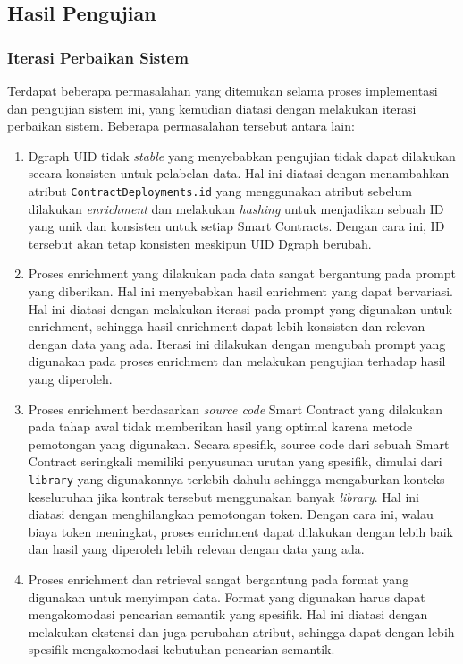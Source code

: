 \subsection{Hasil Pengujian}

\subsubsection{Iterasi Perbaikan Sistem}
\label{subsubsec:iterasi-perbaikan-sistem}

Terdapat beberapa permasalahan yang ditemukan selama proses implementasi dan pengujian sistem ini, yang kemudian diatasi dengan melakukan iterasi perbaikan sistem. Beberapa permasalahan tersebut antara lain:

\begin{enumerate}
	\item Dgraph UID tidak \textit{stable} yang menyebabkan pengujian tidak dapat dilakukan secara konsisten untuk pelabelan data. Hal ini diatasi dengan menambahkan atribut \texttt{ContractDeployments.id} yang menggunakan atribut sebelum dilakukan \textit{enrichment} dan melakukan \textit{hashing} untuk menjadikan sebuah ID yang unik dan konsisten untuk setiap Smart Contracts. Dengan cara ini, ID tersebut akan tetap konsisten meskipun UID Dgraph berubah.
	\item Proses enrichment yang dilakukan pada data sangat bergantung pada prompt yang diberikan. Hal ini menyebabkan hasil enrichment yang dapat bervariasi. Hal ini diatasi dengan melakukan iterasi pada prompt yang digunakan untuk enrichment, sehingga hasil enrichment dapat lebih konsisten dan relevan dengan data yang ada. Iterasi ini dilakukan dengan mengubah prompt yang digunakan pada proses enrichment dan melakukan pengujian terhadap hasil yang diperoleh.
	\item Proses enrichment berdasarkan \textit{source code} Smart Contract yang dilakukan pada tahap awal tidak memberikan hasil yang optimal karena metode pemotongan yang digunakan. Secara spesifik, source code dari sebuah Smart Contract seringkali memiliki penyusunan urutan yang spesifik, dimulai dari \texttt{library} yang digunakannya terlebih dahulu sehingga mengaburkan konteks keseluruhan jika kontrak tersebut menggunakan banyak \textit{library}. Hal ini diatasi dengan menghilangkan pemotongan token. Dengan cara ini, walau biaya token meningkat, proses enrichment dapat dilakukan dengan lebih baik dan hasil yang diperoleh lebih relevan dengan data yang ada.
	\item Proses enrichment dan retrieval sangat bergantung pada format yang digunakan untuk menyimpan data. Format yang digunakan harus dapat mengakomodasi pencarian semantik yang spesifik. Hal ini diatasi dengan melakukan ekstensi dan juga perubahan atribut, sehingga dapat dengan lebih spesifik mengakomodasi kebutuhan pencarian semantik.

\end{enumerate}
